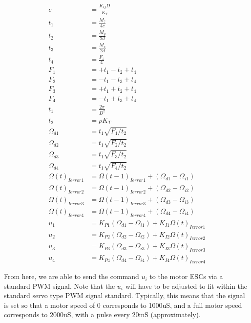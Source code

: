 \documentclass{article}
\numberwithin{equation}{section} %
\begin{document}
{\allowdisplaybreaks \begin{align} 
c &= \frac{K_Q D}{K_T} \\
t_1 &= \frac{M_z}{4c} \\
t_2 &= \frac{M_y}{2d} \\
t_3 &= \frac{M_x}{2d} \\
t_4 &= \frac{F_z}{4} \\
F_1 &= +t_1 - t_2 + t_4 \\
F_2 &= -t_1 - t_3 + t_4 \\
F_3 &= +t_1 + t_2 + t_4 \\
F_4 &= -t_1 + t_3 + t_4 \\
t_1 &= \frac{2 \pi}{D^2} \\
t_2 &= \rho K_T \\
\Omega_{d1}	&=  t_1 \sqrt{F_1 / t_2} \\%
\Omega_{d2}	&=  t_1 \sqrt{F_2 / t_2} \\%
\Omega_{d3}	&=  t_1 \sqrt{F_3 / t_2} \\%
\Omega_{d4}	&=  t_1 \sqrt{F_4 / t_2} \\%
\Omega \left(t \right)_{ Ierror1} &= \Omega \left(t-1 \right)_{ Ierror1} + \left( \Omega_{d1} - \Omega_{i1} \right) \\
\Omega \left(t \right)_{ Ierror2} &= \Omega \left(t-1 \right)_{ Ierror2} + \left( \Omega_{d2} - \Omega_{i2} \right) \\
\Omega \left(t \right)_{ Ierror3} &= \Omega \left(t-1 \right)_{ Ierror3} + \left( \Omega_{d3} - \Omega_{i3} \right) \\
\Omega \left(t \right)_{ Ierror4} &= \Omega \left(t-1 \right)_{ Ierror4} + \left( \Omega_{d4} - \Omega_{i4} \right) \\
u_1 &= K_{P1} \left( \Omega_{d1} - \Omega_{i1} \right) + K_{I1} \Omega \left(t \right) _{Ierror1} \\
u_2 &= K_{P2} \left( \Omega_{d2} - \Omega_{i2} \right) + K_{I2} \Omega \left(t \right) _{Ierror2} \\
u_3 &= K_{P3} \left( \Omega_{d3} - \Omega_{i3} \right) + K_{I3} \Omega \left(t \right) _{Ierror3} \\
u_4 &= K_{P4} \left( \Omega_{d4} - \Omega_{i4} \right) + K_{I4} \Omega \left(t \right) _{Ierror4}
\end{align}}

From here, we are able to send the command $u_i$ to the motor ESCs via a standard PWM signal. Note that the $u_i$ will have to be adjusted to fit within the standard servo type PWM signal standard. Typically, this means that the signal is set so that a motor speed of 0 corresponds to 1000uS, and a full motor speed corresponds to 2000uS, with a pulse every 20mS (approximately).
\end{document}
